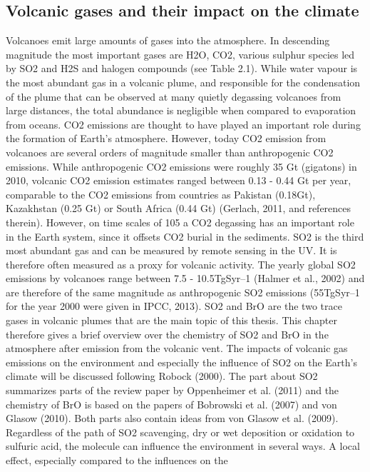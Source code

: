 \documentclass  [
  paper    = a4,
  BCOR     = 10mm,
  twoside,
  fontsize = 12pt,
  fleqn,
  toc      = bibnumbered,
  toc      = listofnumbered,
  numbers  = noendperiod,
  headings = normal,
  listof   = leveldown,
  version  = 3.03
]                                       {scrreprt}
\begin{document}
	\subsection{Volcanic gases and their impact on the climate}
	Volcanoes emit large amounts of gases into the atmosphere. In descending
	magnitude the most important gases are H2O, CO2, various sulphur species led
	by SO2 and H2S and halogen compounds (see Table 2.1). While water vapour is
	the most abundant gas in a volcanic plume, and responsible for the condensation
	of the plume that can be observed at many quietly degassing volcanoes from
	large distances, the total abundance is negligible when compared to evaporation
	from oceans. CO2 emissions are thought to have played an important role
	during the formation of Earth’s atmosphere. However, today CO2 emission
	from volcanoes are several orders of magnitude smaller than anthropogenic CO2
	emissions. While anthropogenic CO2 emissions were roughly 35 Gt (gigatons)
	in 2010, volcanic CO2 emission estimates ranged between 0.13 - 0.44 Gt per
	year, comparable to the CO2 emissions from countries as Pakistan (0.18Gt),
	Kazakhstan (0.25 Gt) or South Africa (0.44 Gt) (Gerlach, 2011, and references
	therein). However, on time scales of 105 a CO2 degassing has an important role
	in the Earth system, since it offsets CO2 burial in the sediments. SO2 is the
	third most abundant gas and can be measured by remote sensing in the UV. It
	is therefore often measured as a proxy for volcanic activity. The yearly global
	SO2 emissions by volcanoes range between 7.5 - 10.5TgSyr–1 (Halmer et al.,
	2002) and are therefore of the same magnitude as anthropogenic SO2 emissions
	(55TgSyr–1 for the year 2000 were given in IPCC, 2013).
	SO2 and BrO are the two trace gases in volcanic plumes that are the main topic
	of this thesis. This chapter therefore gives a brief overview over the chemistry
	of SO2 and BrO in the atmosphere after emission from the volcanic vent. The
	impacts of volcanic gas emissions on the environment and especially the influence
	of SO2 on the Earth’s climate will be discussed following Robock (2000). The
	part about SO2 summarizes parts of the review paper by Oppenheimer et al.
	(2011) and the chemistry of BrO is based on the papers of Bobrowski et al. (2007)
	and von Glasow (2010). Both parts also contain ideas from von Glasow et al.
	(2009).
	Regardless of the path of SO2 scavenging,
	dry or wet deposition or oxidation
	to sulfuric acid, the molecule
	can influence the environment in several
	ways. A local effect, especially
	compared to the influences on the
\end{document}
